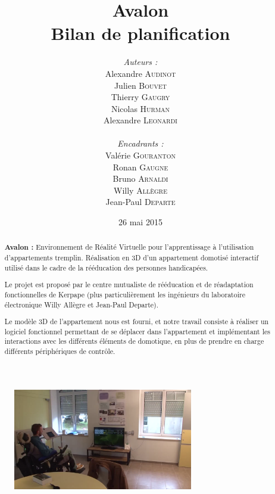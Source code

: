 \documentclass[a4paper,11pt]{article}
\title{
  \textbf{Avalon}\\
  Bilan de planification
}
\author{
\begin{minipage}{0.4\textwidth}
	\begin{flushleft} \large
		\emph{Auteurs :}\\
		Alexandre \textsc{Audinot}\\
		Julien \textsc{Bouvet}\\
		Thierry \textsc{Gaugry}\\
		Nicolas \textsc{Hurman}\\
		Alexandre \textsc{Leonardi}\\
	\end{flushleft}
\end{minipage}
\begin{minipage}{0.4\textwidth}
	\begin{flushright} \large
		\emph{Encadrants :} \\
		Valérie \textsc{Gouranton}\\
		Ronan \textsc{Gaugne}\\
		Bruno \textsc{Arnaldi}\\
		Willy \textsc{Allègre}\\
		Jean-Paul  \textsc{Departe}\\
	\end{flushright}
\end{minipage}
}
\date{26 mai 2015}
\begin{document}
\maketitle
\thispagestyle{empty}
\begin{abstract}
\textbf{Avalon :} Environnement de Réalité Virtuelle pour l'apprentissage à l'utilisation d'appartements tremplin. Réalisation en 3D d'un appartement domotisé interactif utilisé dans le cadre de la rééducation des personnes handicapées.\newline

Le projet est proposé par le centre mutualiste de rééducation et de réadaptation fonctionnelles de Kerpape (plus particulièrement les ingénieurs du laboratoire électronique Willy Allègre et Jean-Paul Departe).\newline

Le modèle 3D de l'appartement nous est fourni, et notre travail consiste à réaliser un logiciel fonctionnel permettant de se déplacer dans l'appartement et implémentant les interactions avec les différents éléments de domotique, en plus de prendre en charge différents périphériques de contrôle. 
\end{abstract}

\begin{figure}[h!]
	\centering
	\includegraphics[width=0.7\textwidth]{8-BilanPlanification/img/screen_appart.png}
\end{figure}
\end{document}
